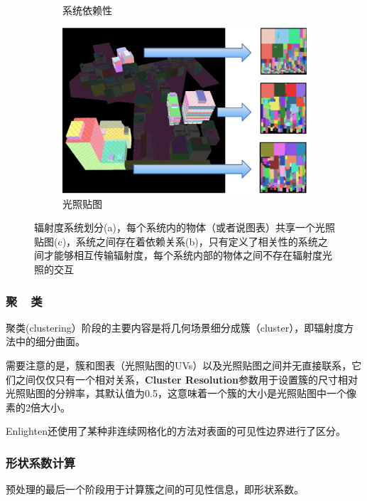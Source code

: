 \begin{figure}
\begin{subfigure}[b]{0.285\textwidth}
		\caption{系统依赖性}
	\end{subfigure}
	\begin{subfigure}[b]{0.42\textwidth}
		\includegraphics[width=1.\textwidth]{figures/r/path-30-3}
		\caption{光照贴图}
	\end{subfigure}
	\caption{辐射度系统划分(a)，每个系统内的物体（或者说图表）共享一个光照贴图(c)，系统之间存在着依赖关系(b)，只有定义了相关性的系统之间才能够相互传输辐射度，每个系统内部的物体之间不存在辐射度光照的交互}
	\label{f:r-systems}
\end{figure}






\subsubsection{聚~~类}\label{sec:r-clustering}
聚类(clustering）阶段的主要内容是将几何场景细分成簇（cluster），即辐射度方法中的细分曲面。

需要注意的是，簇和图表（光照贴图的UVs）以及光照贴图之间并无直接联系，它们之间仅仅只有一个相对关系，\textbf{Cluster Resolution}参数用于设置簇的尺寸相对光照贴图的分辨率，其默认值为0.5，这意味着一个簇的大小是光照贴图中一个像素的2倍大小。

Enlighten还使用了某种非连续网格化的方法对表面的可见性边界进行了区分。




\subsubsection{形状系数计算}
预处理的最后一个阶段用于计算簇之间的可见性信息，即形状系数。

